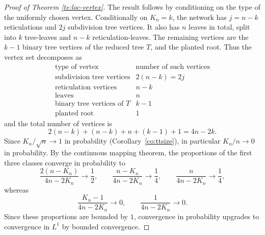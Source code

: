 \documentclass[english,11pt]{smfart}
\numberwithin{equation}{section}
\begin{document}
\begin{proof}[Proof of Theorem \ref{te:loc-vertex}]
The result follows by conditioning on the type of the uniformly chosen vertex.
Conditionally on \(K_n=k\), the network has \(j=n-k\) reticulations and \(2j\)
subdivision tree vertices. It also has \(n\) leaves in total, split into \(k\)
tree-leaves and \(n-k\) reticulation-leaves. The remaining vertices are the
\(k-1\) binary tree vertices of the reduced tree \(T\), and the planted root.
Thus the vertex set decomposes as
\[
\begin{array}{c|c}
\text{type of vertex} & \text{number of such vertices} \\ \hline
\text{subdivision tree vertices} & 2(n-k) = 2j \\
\text{reticulation vertices} & n-k \\
\text{leaves} & n \\
\text{binary tree vertices of }T & k-1 \\
\text{planted root} & 1
\end{array}
\]
and the total number of vertices is
\[
  2(n-k)+(n-k)+n+(k-1)+1=4n-2k.
\]
\smallskip
Since \(K_n/\sqrt n\to 1\) in probability (Corollary~\ref{co:ttsize}), in
particular \(K_n/n\to 0\) in probability. By the continuous mapping theorem,
the proportions of the first three classes converge in probability to
\[
  \frac{2(n-K_n)}{4n-2K_n}\to \frac12,\qquad
  \frac{n-K_n}{4n-2K_n}\to \frac14,\qquad
  \frac{n}{4n-2K_n}\to \frac14,
\]
whereas
\[
  \frac{K_n-1}{4n-2K_n}\to0,
  \qquad
  \frac{1}{4n-2K_n}\to0.
\]
Since these proportions are bounded by $1$, convergence in probability
upgrades to convergence in $L^1$ by bounded convergence.


\end{proof}
\end{document}
